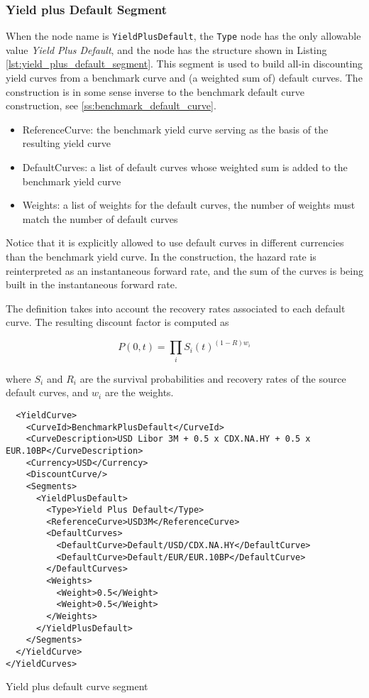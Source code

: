 \subsubsection*{Yield plus Default Segment}
\label{sec:yield_plus_default}

When the node name is \lstinline!YieldPlusDefault!, the \lstinline!Type! node has the only allowable value \emph{Yield
 Plus Default}, and the node has the structure shown in Listing \ref{lst:yield_plus_default_segment}. This segment is
used to build all-in discounting yield curves from a benchmark curve and (a weighted sum of) default curves. The
construction is in some sense inverse to the benchmark default curve construction, see \ref{ss:benchmark_default_curve}.

\begin{itemize}
\item ReferenceCurve: the benchmark yield curve serving as the basis of the resulting yield curve
\item DefaultCurves: a list of default curves whose weighted sum is added to the benchmark yield curve
\item Weights: a list of weights for the default curves, the number of weights must match the number of default curves
\end{itemize}

Notice that it is explicitly allowed to use default curves in different currencies than the benchmark yield curve. In
the construction, the hazard rate is reinterpreted as an instantaneous forward rate, and the sum of the curves is being
built in the instantaneous forward rate.

The definition takes into account the recovery rates associated to each default curve. The resulting discount factor is
computed as

\begin{equation}
P(0,t) = \prod_i  S_i(t)^{(1-R)w_i}
\end{equation}

where $S_i$ and $R_i$ are the survival probabilities and recovery rates of the source default curves, and $w_i$ are the
weights.

\begin{listing}[H]
\begin{verbatim}
  <YieldCurve>
    <CurveId>BenchmarkPlusDefault</CurveId>
    <CurveDescription>USD Libor 3M + 0.5 x CDX.NA.HY + 0.5 x EUR.10BP</CurveDescription>
    <Currency>USD</Currency>
    <DiscountCurve/>
    <Segments>
      <YieldPlusDefault>
        <Type>Yield Plus Default</Type>
        <ReferenceCurve>USD3M</ReferenceCurve>
        <DefaultCurves>
          <DefaultCurve>Default/USD/CDX.NA.HY</DefaultCurve>
          <DefaultCurve>Default/EUR/EUR.10BP</DefaultCurve>
        </DefaultCurves>
        <Weights>
          <Weight>0.5</Weight>
          <Weight>0.5</Weight>
        </Weights>
      </YieldPlusDefault>
    </Segments>
  </YieldCurve>
</YieldCurves>
\end{verbatim}
\caption{Yield plus default curve segment}
\label{lst:yield_plus_default_segment}
\end{listing}

